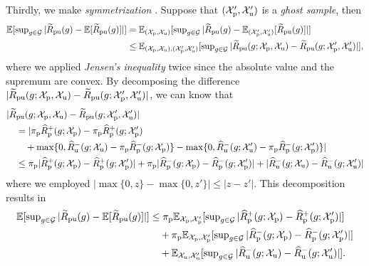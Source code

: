 Thirdly, we make \emph{symmetrization} \citep{vapnik98SLT}. Suppose that $(\Xp',\Xu')$ is a \emph{ghost sample}, then
\begin{align*}
\bE[\sup\nolimits_{g\in\cG}|\tRpu(g)-\bE[\tRpu(g)]|]
&= \bE_{(\Xp,\Xu)}[\sup\nolimits_{g\in\cG}|\tRpu(g)-\bE_{(\Xp',\Xu')}[\tRpu(g)]|]\\
&\le \bE_{(\Xp,\Xu),(\Xp',\Xu')}[\sup\nolimits_{g\in\cG}|\tRpu(g;\Xp,\Xu)-\tRpu(g;\Xp',\Xu')|],
\end{align*}
where we applied \emph{Jensen's inequality} twice since the absolute value and the supremum are convex. By decomposing the difference $|\tRpu(g;\Xp,\Xu)-\tRpu(g;\Xp',\Xu')|$, we can know that
\begin{align*}
&|\tRpu(g;\Xp,\Xu)-\tRpu(g;\Xp',\Xu')|\\
&\quad = |\pip\hRp^+(g;\Xp)-\pip\hRp^+(g;\Xp')\\
&\qquad +\max\{0,\hRu^-(g;\Xu)-\pip\hRp^-(g;\Xp)\}
-\max\{0,\hRu^-(g;\Xu')-\pip\hRp^-(g;\Xp')\}|\\
&\quad \le \pip|\hRp^+(g;\Xp)-\hRp^+(g;\Xp')|
+\pip|\hRp^-(g;\Xp)-\hRp^-(g;\Xp')|
+|\hRu^-(g;\Xu)-\hRu^-(g;\Xu')|
\end{align*}
where we employed $|\max\{0,z\}-\max\{0,z'\}|\le|z-z'|$. This decomposition results in
\begin{align}
\bE[\sup\nolimits_{g\in\cG}|\tRpu(g)-\bE[\tRpu(g)]|]
&\le \pip\bE_{\Xp,\Xp'}[\sup\nolimits_{g\in\cG}|\hRp^+(g;\Xp)-\hRp^+(g;\Xp')|] \notag\\
&\quad +\pip\bE_{\Xp,\Xp'}[\sup\nolimits_{g\in\cG}|\hRp^-(g;\Xp)-\hRp^-(g;\Xp')|] \notag\\
\label{eq:uni-dev-symmetrization}%
&\quad +\bE_{\Xu,\Xu'}[\sup\nolimits_{g\in\cG}|\hRu^-(g;\Xu)-\hRu^-(g;\Xu')|].
\end{align}


